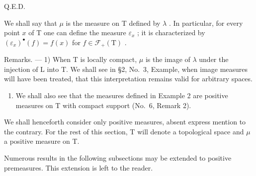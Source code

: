 Q.E.D.

We shall say that \(\mu\) is the measure on T defined by \(\lambda\) . In particular, for every point \(x\) of T one can define the measure \(\varepsilon_x\) ; it is characterized by \((\varepsilon_x)^{\bullet}(f) = f(x)\) for \(f \in \mathcal{F}_{+}(\mathrm{T})\) .

Remarks. --- 1) When T is locally compact, \(\mu\) is the image of \(\lambda\) under the injection of L into T. We shall see in §2, No.~3, Example, when image measures will have been treated, that this interpretation remains valid for arbitrary spaces.

\begin{enumerate}
\def\labelenumi{\arabic{enumi})}
\setcounter{enumi}{1}
\tightlist
\item
  We shall also see that the measures defined in Example 2 are positive measures on T with compact support (No.~6, Remark 2).
\end{enumerate}

We shall henceforth consider only positive measures, absent express mention to the contrary. For the rest of this section, T will denote a topological space and \(\mu\) a positive measure on T.

Numerous results in the following subsections may be extended to positive premeasures. This extension is left to the reader.

